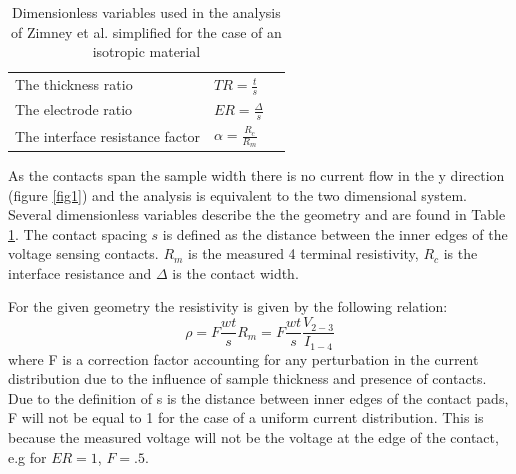  \begin{table}[b]
\begin{center}
    \begin{tabular}{|l|l|l|  }
    \hline
     The thickness ratio & $TR = \frac{t}{s}$ \\ 
     The electrode ratio & $ER =  \frac{\Delta}{s}$ \\ 
     The interface resistance factor & $\alpha = \frac{R_c}{R_m}$ \\
     \hline
    \end{tabular}
\end{center}
\caption{Dimensionless variables used in the analysis of Zimney et al. simplified for the case of an isotropic material \cite{Zimney2007CorrectionStudy}}
\label{Tab1}
\end{table}
 
As the contacts span the sample width there is no current flow in the y direction (figure \ref{fig1}) and the analysis is equivalent to the two dimensional system. Several dimensionless variables describe the the geometry and are found in Table \ref{Tab1}. The contact spacing $s$ is defined as the distance between the inner edges of the voltage sensing contacts. $R_m$ is the measured 4 terminal resistivity, $R_c$ is the interface resistance and $\Delta$ is the contact width. 

For the given geometry the resistivity is given by the following relation: 
\begin{equation}
    \rho   = F \frac{wt}{s}R_m = F \frac{wt}{s}\frac{V_{2-3}}{I_{1-4}}
\end{equation} 
where F is a correction factor accounting for any perturbation in the current distribution due to the influence of sample thickness and presence of contacts. Due to the definition of s is the distance between inner edges of the contact pads, F will not be equal to 1 for the case of a uniform current distribution. This is because the measured voltage will not be the voltage at the edge of the contact, e.g for $ER = 1$, $F = .5$.


